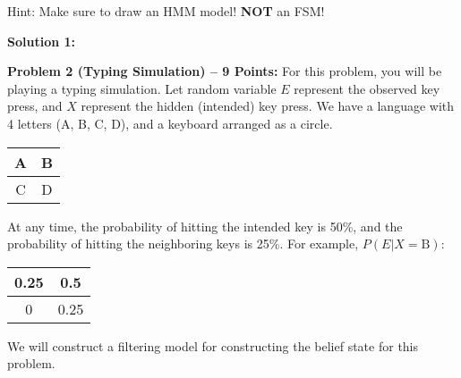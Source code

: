 \documentclass[]{article}
\begin{document}
Hint: Make sure to draw an HMM model!  \textbf{NOT} an FSM!

  
\begin{enumerate}[label=(\alph*)]

\end{enumerate}

\bigskip

\textbf{Solution 1:}

\clearpage

\textbf{Problem 2 (Typing Simulation) -- 9 Points:}
For this problem, you will be playing a typing simulation. Let random variable $E$ represent the observed key press, and $X$ represent the hidden (intended) key press. We have a language with 4 letters (A, B, C, D), and a keyboard arranged as a circle.

\begin{table}[htb]
\centering
    \begin{tabular}{|c|c|}
      \hline
        A & B \\\hline
        C & D \\\hline
    \end{tabular}
\end{table}

At any time, the probability of hitting the intended key is 50\%, and the probability of hitting the neighboring keys is 25\%. For example, $P(E | X = \mathrm{B})$:
\begin{table}[htb]
\centering
    \begin{tabular}{|c|c|}
      \hline
        0.25 & 0.5 \\\hline
        0 & 0.25 \\\hline
    \end{tabular}
\end{table}

We will construct a filtering model for constructing the belief state for this problem.
\bigskip
\end{document}
